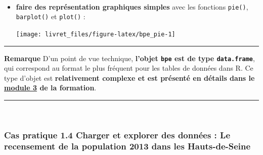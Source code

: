 \documentclass[12pt,twosided, notitlepage]{book}
\newenvironment{Shaded}{}{}
\newcommand{\KeywordTok}[1]{\textcolor[rgb]{0.00,0.00,1.00}{#1}}
\newcommand{\DataTypeTok}[1]{#1}
\newcommand{\CharTok}[1]{\textcolor[rgb]{0.00,0.50,0.50}{#1}}
\newcommand{\StringTok}[1]{\textcolor[rgb]{0.00,0.50,0.50}{#1}}
\newcommand{\CommentTok}[1]{\textcolor[rgb]{0.00,0.50,0.00}{#1}}
\newcommand{\OperatorTok}[1]{#1}
\newcommand{\NormalTok}[1]{#1}
\renewenvironment{Shaded}{\begin{snugshade}}{\end{snugshade}}
\begin{document}
~

\begin{itemize}
\item
  \textbf{faire des représentation graphiques simples} avec les
  fonctions \texttt{pie()},
  \texttt{barplot()} et
  \texttt{plot()} :

\begin{Shaded}
\end{Shaded}

  \begin{center}\texttt{[image: livret\_files/figure-latex/bpe\_pie-1]} \end{center}
\end{itemize}

\begin{center}\rule{0.5\linewidth}{\linethickness}\end{center}

\textbf{Remarque} D'un point de vue technique, \textbf{l'objet
\texttt{bpe} est de type \texttt{data.frame}}, qui correspond au format
le plus fréquent pour les tables de données dans R. Ce type d'objet est
\textbf{relativement complexe et est présenté en détails dans le
\underline{module 3} de la formation}.

\begin{center}\rule{0.5\linewidth}{\linethickness}\end{center}

~

\subsubsection{\texorpdfstring{\textbf{Cas pratique 1.4} Charger et
explorer des données : Le recensement de la population 2013 dans les
Hauts-de-Seine}{Cas pratique 1.4 Charger et explorer des données : Le recensement de la population 2013 dans les Hauts-de-Seine}}\label{cas-pratique-1.4-charger-et-explorer-des-donnees-le-recensement-de-la-population-2013-dans-les-hauts-de-seine}
\end{document}
